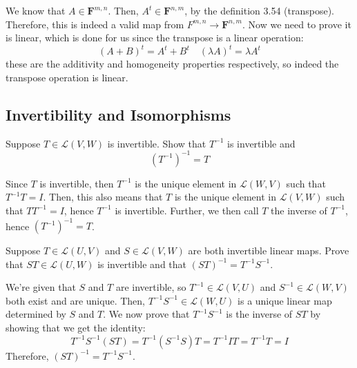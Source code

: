 \documentclass[10pt]{article}
\newcommand{\F}{\mathbf F}
\begin{document}
	\begin{solution}
		We know that \( A \in \F^{m, n} \). Then, \( A^{t} \in \F^{n, m} \), by the definition 3.54 (transpose). 
		Therefore, this is indeed a valid map from \( F^{m, n} \to \F^{n, m} \). Now we need to prove it is linear, 
		which is done for us since the transpose is a linear operation:
		\[
			(A + B)^{t} = A^{t} + B^{t} \quad (\lambda A)^{t} = \lambda A^{t}
		\] 
		these are the additivity and homogeneity properties respectively, so indeed the transpose operation is linear.
	\end{solution}

	\subsection{Invertibility and Isomorphisms}
	\begin{problem}
		Suppose \( T \in \mathcal L(V, W) \) is invertible. Show that \( T^{-1} \) is invertible and 
		\[
			(T^{-1})^{-1} = T
		\] 
	\end{problem}

	\begin{solution}
		Since \( T \) is invertible, then \( T^{-1} \) is the unique element in \( \mathcal L(W, V) \) such that 
		\( T^{-1}T = I \). Then, this also means that \( T \) is the unique element in \( \mathcal  L(V, W) \) 
		such that \( T T^{-1} = I \), hence \( T^{-1} \) is invertible. Further, we then call \( T \) the 
		inverse of \( T^{-1} \), hence \( (T^{-1})^{-1} = T \). 
	\end{solution}
	
	\begin{problem}
		Suppose \( T \in \mathcal L(U, V) \) and \( S \in \mathcal L(V, W) \) are both invertible linear maps. 
		Prove that \( ST \in \mathcal L(U, W) \) is invertible and that \( (ST)^{-1} = T^{-1}S^{-1} \). 
	\end{problem}

	\begin{solution}
		We're given that \( S \) and \( T \) are invertible, so \( T^{-1} \in \mathcal L (V, U) \) 
		and \( S^{-1} \in \mathcal L(W, V) \) both exist and are unique. Then, \( T^{-1}S^{-1} \in \mathcal L(W, U)\) 
		is a unique linear map determined by \( S \) and \( T \). We now prove that \( T^{-1}S^{-1} \) is the inverse 
		of \( ST \) by showing that we get the identity:
		\[
			T^{-1}S^{-1}(ST) = T^{-1} (S^{-1} S) T = T^{-1} I T = T^{-1} T = I
		\] 
		Therefore, \( (ST)^{-1} = T^{-1} S^{-1} \). 
	\end{solution}
	
\end{document}
